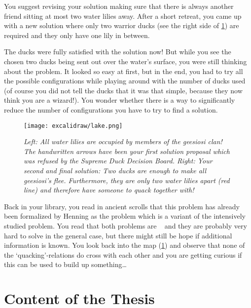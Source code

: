 You suggest revising your solution making sure that there is always another friend sitting at most two water lilies away. After a short retreat, you came up with a new solution where only two warrior ducks (see the right side of \cref{fig:duck-lake}) are required and they only have one lily in between. 

The ducks were fully satisfied with the solution now! 
But while you see the chosen two ducks being sent out over the water's surface, you were still thinking about the problem.
It looked so easy at first, but in the end, you had to try all the possible configurations while playing around with the number of ducks used (of course you did not tell the ducks that it was that simple, because they now think you are a wizard!).
You wonder whether there is a way to significantly reduce the number of configurations you have to try to find a solution.

\begin{figure}[t]
    \centering
    \texttt{[image: excalidraw/lake.png]}
    \caption[Introductions: Merganser Lake. Own Drawing. Embedded icons under public domain from {\href{https://creazilla.com/}{https://creazilla.com/}}]{\textit{Left: All water lilies are occupied by members of the \textit{geesiosi} clan! The handwritten arrows have been your first solution proposal which was refused by the \textit{Supreme Duck Decision Board}.
    Right: Your second and final solution: Two ducks are enough to make all \textit{geesiosi}'s flee. Furthermore, they are only two water lilies apart (red line) and therefore have someone to quack together with!}}
    \label{fig:duck-lake}
\end{figure}

Back in your library, you read in ancient scrolls that this problem has already been formalized by Henning \cite{Henning2019} as the \sdom problem which is a variant of the intensively studied \dom problem. 
You read that both problems are \NPc~\cite{Garey1979,Henning2019} and they are probably very hard to solve in the general case, but there might still be hope if additional information is known. 
You look back into the map (\cref{fig:duck-lake}) and observe that none of the `quacking'-relations do cross with each other and you are getting curious if this can be used to build up something\ldots

\section{Content of the Thesis}

